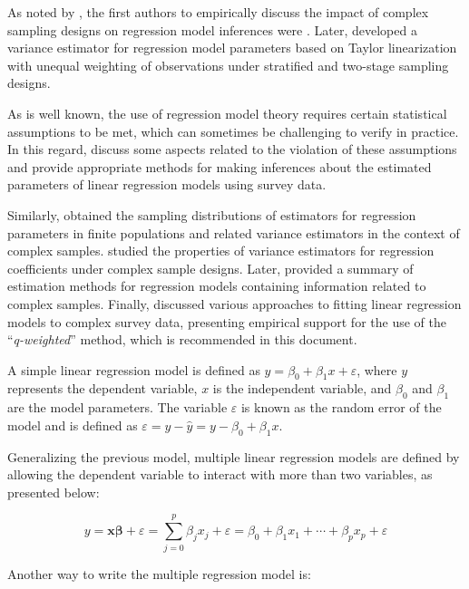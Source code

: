 \documentclass[
  12pt,
]{book}
\begin{document}
As noted by \citet{Heeringa_West_Berglund_2017}, the first authors to empirically discuss the impact of complex sampling designs on regression model inferences were \citet{kish1974inference}. Later, \citet{fuller1975regression} developed a variance estimator for regression model parameters based on Taylor linearization with unequal weighting of observations under stratified and two-stage sampling designs.

As is well known, the use of regression model theory requires certain statistical assumptions to be met, which can sometimes be challenging to verify in practice. In this regard, \citet{shah1977inference} discuss some aspects related to the violation of these assumptions and provide appropriate methods for making inferences about the estimated parameters of linear regression models using survey data.

Similarly, \citet{binder1983variances} obtained the sampling distributions of estimators for regression parameters in finite populations and related variance estimators in the context of complex samples. \citet{skinner1989analysis} studied the properties of variance estimators for regression coefficients under complex sample designs. Later, \citet{fuller2002regression} provided a summary of estimation methods for regression models containing information related to complex samples. Finally, \citet{pfeffermann2011modelling} discussed various approaches to fitting linear regression models to complex survey data, presenting empirical support for the use of the ``\emph{q-weighted}'' method, which is recommended in this document.

A simple linear regression model is defined as \(y=\beta_{0}+\beta_{1}x+\varepsilon\), where \(y\) represents the dependent variable, \(x\) is the independent variable, and \(\beta_{0}\) and \(\beta_{1}\) are the model parameters. The variable \(\varepsilon\) is known as the random error of the model and is defined as \(\varepsilon=y-\hat{y}=y-\beta_{0}+\beta_{1}x\).

Generalizing the previous model, multiple linear regression models are defined by allowing the dependent variable to interact with more than two variables, as presented below:

\[
y  =  \boldsymbol{x}\boldsymbol{\beta}+\varepsilon
  =  \sum_{j=0}^{p}\beta_{j}x_{j}+\varepsilon
 =  \beta_{0}+\beta_{1}x_{1}+\cdots+\beta_{p}x_{p}+\varepsilon
\]

Another way to write the multiple regression model is:
\end{document}

